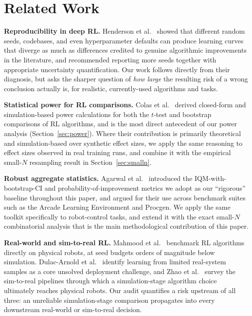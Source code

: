 \documentclass[journal]{IEEEtran}
\begin{document}
\section{Related Work}

\textbf{Reproducibility in deep RL.} Henderson et al.~\cite{henderson2018deep} showed that
different random seeds, codebases, and even hyperparameter defaults can produce learning curves
that diverge as much as differences credited to genuine algorithmic improvements in the
literature, and recommended reporting more seeds together with appropriate uncertainty
quantification. Our work follows directly from their diagnosis, but asks the sharper question of
\emph{how large} the resulting risk of a wrong conclusion actually is, for realistic, currently-used
algorithms and tasks.

\textbf{Statistical power for RL comparisons.} Colas et al.~\cite{colas2018many} derived
closed-form and simulation-based power calculations for both the $t$-test and bootstrap
comparisons of RL algorithms, and is the most direct antecedent of our power analysis
(Section~\ref{sec:power}). Where their contribution is primarily theoretical and simulation-based
over synthetic effect sizes, we apply the same reasoning to effect sizes observed in real training
runs, and combine it with the empirical small-$N$ resampling result in
Section~\ref{sec:smalln}.

\textbf{Robust aggregate statistics.} Agarwal et al.~\cite{agarwal2021deep} introduced the
IQM-with-bootstrap-CI and probability-of-improvement metrics we adopt as our ``rigorous'' baseline
throughout this paper, and argued for their use across benchmark suites such as the Arcade
Learning Environment and Procgen. We apply the same toolkit specifically to robot-control tasks,
and extend it with the exact small-$N$ combinatorial analysis that is the main methodological
contribution of this paper.

\textbf{Real-world and sim-to-real RL.} Mahmood et al.~\cite{mahmood2018benchmarking} benchmark RL
algorithms directly on physical robots, at seed budgets orders of magnitude below simulation.
Dulac-Arnold et al.~\cite{dulac2021challenges} identify learning from limited real-system samples
as a core unsolved deployment challenge, and Zhao et al.~\cite{zhao2020simtoreal} survey the
sim-to-real pipelines through which a simulation-stage algorithm choice ultimately reaches physical
robots. Our audit quantifies a risk upstream of all three: an unreliable simulation-stage
comparison propagates into every downstream real-world or sim-to-real decision.
\end{document}
